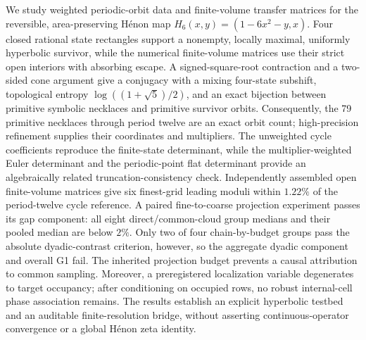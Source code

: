 We study weighted periodic-orbit data and finite-volume transfer matrices for
the reversible, area-preserving H\'enon map
$H_6(x,y)=(1-6x^2-y,x)$.  Four closed rational state rectangles support a
nonempty, locally maximal, uniformly hyperbolic survivor, while the numerical
finite-volume matrices use their strict open interiors with absorbing escape.
A signed-square-root contraction and a two-sided cone argument give
a conjugacy with a mixing four-state subshift, topological entropy
$\log((1+\sqrt5)/2)$, and an exact bijection between primitive symbolic
necklaces and primitive survivor orbits.  Consequently, the 79 primitive
necklaces through period twelve are an exact orbit count; high-precision
refinement supplies their coordinates and multipliers.  The unweighted cycle
coefficients reproduce the finite-state determinant, while the
multiplier-weighted Euler determinant and the periodic-point flat determinant
provide an algebraically related truncation-consistency check.  Independently
assembled open finite-volume matrices give six finest-grid leading moduli
within $1.22\%$ of the period-twelve cycle reference.  A paired
fine-to-coarse projection experiment passes its gap component: all eight
direct/common-cloud group medians and their pooled median are below $2\%$.
Only two of four chain-by-budget groups pass the absolute dyadic-contrast
criterion, however, so the aggregate dyadic component and overall G1 fail.
The inherited projection budget prevents a causal attribution to common
sampling.  Moreover, a
preregistered localization variable degenerates to target occupancy; after
conditioning on occupied rows, no robust internal-cell phase association
remains.  The results establish an explicit hyperbolic testbed and an auditable
finite-resolution bridge, without asserting continuous-operator
convergence or a global H\'enon zeta identity.
